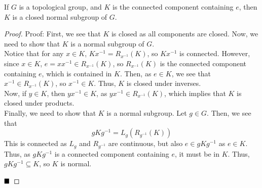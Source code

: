 \begin{lemma}
    If $G$ is a topological group, and $K$ is the connected component containing $e$, then $K$ is a closed normal subgroup of $G$. 
\end{lemma}
\begin{proof}{Proof:}
    First, we see that $K$ is closed as all components are closed. Now, we need to show that $K$ is a normal subgroup of $G$.\\

    Notice that for any $x \in K$, $Kx^{-1} = R_{x^{-1}}(K)$, so $Kx^{-1}$ is connected. However, since $x \in K$, $e = xx^{-1} \in R_{x^{-1}}(K)$, so $R_{x^{-1}}(K)$ is the connected component containing $e$, which is contained in $K$. Then, as $e \in K$, we see that $x^{-1} \in R_{x^{-1}}(K)$, so $x^{-1} \in K$. Thus, $K$ is closed under inverses.\\

    Now, if $y \in K$, then $yx^{-1} \in K$, as $yx^{-1} \in R_{x^{-1}}(K)$, which implies that $K$ is closed under products.\\

    Finally, we need to show that $K$ is a normal subgroup. Let $g \in G$. Then, we see that
    \[ gKg^{-1} = L_{g}(R_{g^{-1}}(K)) \]
    This is connected as $L_{g}$ and $R_{g^{-1}}$ are continuous, but also $e \in gKg^{-1}$ as $e \in K$. Thus, as $gKg^{-1}$ is a connected component containing $e$, it must be in $K$. Thus, $gKg^{-1} \subseteq K$, so $K$ is normal.

    $\qed$
\end{proof}


